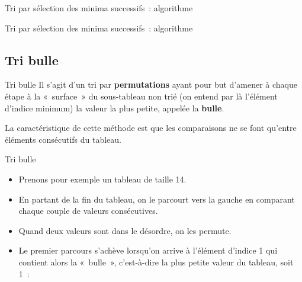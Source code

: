 \begin{frame}{Tri par sélection des minima successifs~: algorithme}
\end{frame}

\begin{frame}{Tri par sélection des minima successifs~: algorithme}
\end{frame}

\subsection{Tri bulle}

\begin{frame}{Tri bulle}
	Il s’agit d’un tri par \textbf{permutations} ayant pour but d’amener à
	chaque étape à la «~surface~» du sous-tableau non trié (on entend par
	là l’élément d’indice minimum) la valeur la plus petite, appelée la
	\textbf{bulle}. 
	
	\bigskip
	
	La caractéristique de cette méthode est que les
	comparaisons ne se font qu’entre éléments consécutifs du tableau.
\end{frame}

\begin{frame}{Tri bulle}
	\begin{itemize}
		\item
		Prenons pour exemple un tableau de taille 14. 
		\item
		En partant de la fin du tableau, on le parcourt vers la 
		gauche en comparant chaque couple de valeurs consécutives. 
		\item
		Quand deux valeurs sont dans le désordre, on les permute. 
		\item
		Le premier parcours s’achève lorsqu’on arrive à l’élément
		d’indice 1 qui contient alors la «~bulle~»,
		c'est-à-dire la plus petite valeur du tableau, soit 1~:
	\end{itemize}
\end{frame}

